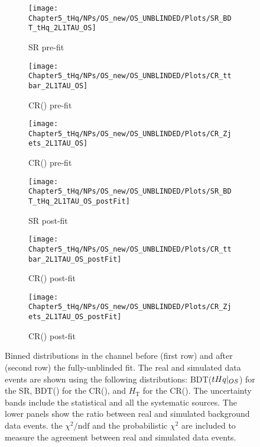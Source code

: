 \begin{figure}[ht]
    \centering
    \begin{subfigure}[b]{0.32\textwidth}
        \centering
        \texttt{[image: Chapter5\_tHq/NPs/OS\_new/OS\_UNBLINDED/Plots/SR\_BDT\_tHq\_2L1TAU\_OS]}
        \caption{SR pre-fit}
        \label{fig:ChaptH:fitToData:OS:prepostfit:prefit:SR}
    \end{subfigure}
    \hfill %
    \begin{subfigure}[b]{0.32\textwidth}
        \centering
        \texttt{[image: Chapter5\_tHq/NPs/OS\_new/OS\_UNBLINDED/Plots/CR\_ttbar\_2L1TAU\_OS]}
        \caption{CR(\ttbar) pre-fit}
        \label{fig:ChaptH:fitToData:OS:prepostfit:prefit:CRtt}
    \end{subfigure}
    \hfill
    \begin{subfigure}[b]{0.32\textwidth}
        \centering
        \texttt{[image: Chapter5\_tHq/NPs/OS\_new/OS\_UNBLINDED/Plots/CR\_Zjets\_2L1TAU\_OS]}
        \caption{CR(\Zjets) pre-fit}
        \label{fig:ChaptH:fitToData:OS:prepostfit:prefit:CRZjet}
    \end{subfigure}
    
    \begin{subfigure}[b]{0.32\textwidth}
        \centering
        \texttt{[image: Chapter5\_tHq/NPs/OS\_new/OS\_UNBLINDED/Plots/SR\_BDT\_tHq\_2L1TAU\_OS\_postFit]}
        \caption{SR post-fit}
        \label{fig:ChaptH:fitToData:OS:prepostfit:postfit:SR}
    \end{subfigure}
    \hfill
    \begin{subfigure}[b]{0.32\textwidth}
        \centering
        \texttt{[image: Chapter5\_tHq/NPs/OS\_new/OS\_UNBLINDED/Plots/CR\_ttbar\_2L1TAU\_OS\_postFit]}
        \caption{CR(\ttbar) post-fit}
        \label{fig:ChaptH:fitToData:OS:prepostfit:postfit:CRtt}
    \end{subfigure}
    \hfill
    \begin{subfigure}[b]{0.32\textwidth}
        \centering
        \texttt{[image: Chapter5\_tHq/NPs/OS\_new/OS\_UNBLINDED/Plots/CR\_Zjets\_2L1TAU\_OS\_postFit]}
        \caption{CR(\Zjets) post-fit}
        \label{fig:ChaptH:fitToData:OS:prepostfit:postfit:CRZjet}
    \end{subfigure}
    \caption{Binned distributions in the \dilepOStau channel before (first row) and after (second row) the fully-unblinded fit.
    The real and simulated data events are shown using the following distributions: BDT($tHq|_{OS}$) for the SR, 
    BDT(\ttbar) for the CR(\ttbar), and $H_{\text{T}}$ for the  CR(\Zjets). The uncertainty bands include the statistical and 
    all the systematic sources. The lower panels show the ratio between real and simulated background data events.
    the $\chi^{2}/\text{ndf}$ and the probabilistic $\chi^{2}$ are included to measure the agreement between 
    real and simulated data events.}
    \label{fig:ChaptH:fitToData:OS:prepostfit}
\end{figure}


